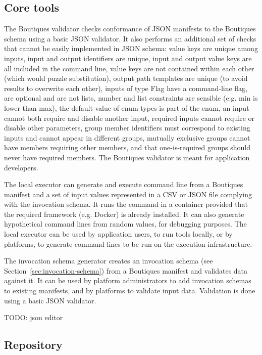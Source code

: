 \documentclass{article}
\newcommand{\todo}[1]{\color{red}TODO: #1\color{black}}
\begin{document}
\subsection{Core tools} 

The Boutiques validator checks conformance of JSON manifests to the
Boutiques schema using a basic JSON validator. It also performs an
additional set of checks that cannot be easily implemented in JSON
schema: value keys are unique among inputs, input and output
identifiers are unique, input and output value keys are all
included in the command line, value keys are not contained
within each other (which would puzzle substitution), output path
templates are unique (to avoid results to overwrite each other),
inputs of type Flag have a command-line flag, are optional and are not
lists, number and list constraints are sensible (e.g. min is lower
than max), the default value of enum types is part of the enum, an
input cannot both require and disable another input, required inputs
cannot require or disable other parameters, group member identifiers
must correspond to existing inputs and cannot appear in different
groups, mutually exclusive groups cannot have members requiring other
members, and that one-is-required groups should never have required
members. The Boutiques validator is meant for application developers.

The local executor can generate and execute command line from a
Boutiques manifest and a set of input values represented in a CSV or
JSON file complying with the invocation schema. It runs the
command in a container provided that the required framework
(e.g. Docker) is already installed. It can also generate hypothetical
command lines from random values, for debugging purposes. The local
executor can be used by application users, to run tools locally, or by
platforms, to generate command lines to be run on the execution
infrastructure.

The invocation schema generator creates an invocation schema (see
Section~\ref{sec:invocation-schema}) from a Boutiques manifest and
validates data against it. It can be used by platform administrators
to add invocation schemas to existing manifests, and by platforms to
validate input data. Validation is done using a basic JSON
validator.

\todo{json editor}

\subsection{Repository}
\end{document}
